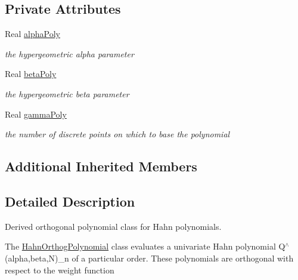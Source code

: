 \subsection*{Private Attributes}
\begin{DoxyCompactItemize}
\item 
Real \hyperlink{classPecos_1_1HahnOrthogPolynomial_a11666846719189915a02ac6f1f96e393}{alpha\+Poly}\label{classPecos_1_1HahnOrthogPolynomial_a11666846719189915a02ac6f1f96e393}

\begin{DoxyCompactList}\small\item\em the hypergeometric alpha parameter \end{DoxyCompactList}\item 
Real \hyperlink{classPecos_1_1HahnOrthogPolynomial_a96c0b0201ca445f95be14ec035b595cb}{beta\+Poly}\label{classPecos_1_1HahnOrthogPolynomial_a96c0b0201ca445f95be14ec035b595cb}

\begin{DoxyCompactList}\small\item\em the hypergeometric beta parameter \end{DoxyCompactList}\item 
Real \hyperlink{classPecos_1_1HahnOrthogPolynomial_aab2965f5a9b7c56742b552acb9f458b0}{gamma\+Poly}\label{classPecos_1_1HahnOrthogPolynomial_aab2965f5a9b7c56742b552acb9f458b0}

\begin{DoxyCompactList}\small\item\em the number of discrete points on which to base the polynomial \end{DoxyCompactList}\end{DoxyCompactItemize}
\subsection*{Additional Inherited Members}


\subsection{Detailed Description}
Derived orthogonal polynomial class for Hahn polynomials. 

The \hyperlink{classPecos_1_1HahnOrthogPolynomial}{Hahn\+Orthog\+Polynomial} class evaluates a univariate Hahn polynomial Q$^\wedge$(alpha,beta,N)\+\_\+n of a particular order. These polynomials are orthogonal with respect to the weight function


